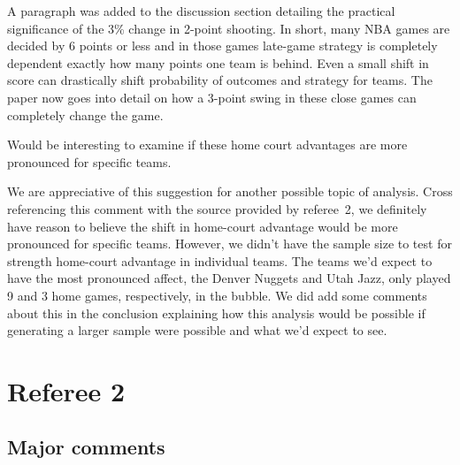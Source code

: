 \documentclass[12pt]{article}
\newenvironment{comment}%
{\begin{quoting}\noindent\small\it\ignorespaces%
  }{\end{quoting}}
\begin{document}
 A paragraph was added to the discussion section detailing the practical 
 significance of the 3\% change in 2-point shooting. In short, many NBA games 
 are decided by 6 points or less and in those games late-game strategy is 
 completely dependent exactly how many points one team is behind. Even a small
 shift in score can drastically shift probability of outcomes and strategy 
 for teams. The paper now goes into detail on how a 3-point swing in these 
 close games can completely change the game.

\begin{comment}
Would be interesting to examine if these home court advantages are 
more pronounced for specific teams.
\end{comment}

 We are appreciative of this suggestion for another possible topic of analysis. 
 Cross referencing this comment with the source provided by referee~2, we definitely 
 have reason to believe the shift in home-court advantage would be more pronounced 
 for specific teams. However, we didn't have the sample size to test for strength 
 home-court advantage in individual teams. The teams we'd expect to have the 
 most pronounced affect, the Denver Nuggets and Utah Jazz, only played 9 and 3
 home games, respectively, in the bubble. We did add some comments about this 
 in the conclusion explaining how this analysis would be possible if generating
 a larger sample were possible and what we'd expect to see.


\section*{Referee 2}

\subsection*{Major comments}
\end{document}
